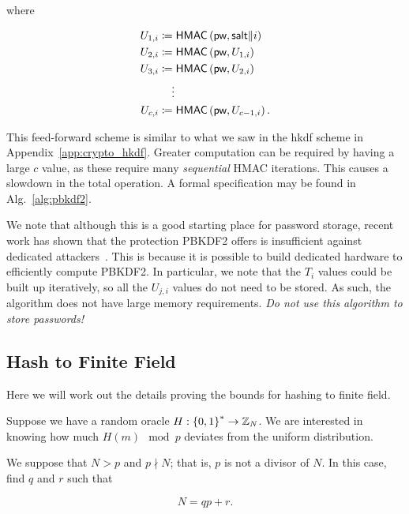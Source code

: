 \noindent
where

\begin{align}
    U_{1,i} &\coloneqq{} \textsf{HMAC}\left( \textsf{pw}, \textsf{salt} \| i \right)
        \nonumber\\
    U_{2,i} &\coloneqq{} \textsf{HMAC}\left( \textsf{pw}, U_{1,i} \right)
        \nonumber\\
    U_{3,i} &\coloneqq{} \textsf{HMAC}\left( \textsf{pw}, U_{2,i} \right)
        \nonumber\\
        &\quad \vdots \nonumber\\
    U_{c,i} &\coloneqq{} \textsf{HMAC}\left( \textsf{pw}, U_{c-1,i} \right).
\end{align}

\noindent
This feed-forward scheme is similar to what we saw in the \gls{hkdf}
scheme in Appendix~\ref{app:crypto_hkdf}.
Greater computation can be required by having a large $c$ value,
as these require many \emph{sequential} \textsf{HMAC} iterations.
This causes a slowdown in the total operation.
A formal specification may be found in Alg.~\ref{alg:pbkdf2}.

We note that although this is a good starting place for password storage,
recent work has shown that the protection PBKDF2 offers
is insufficient against dedicated attackers~\cite{blocki2018economics}.
This is because it is possible to build dedicated hardware
to efficiently compute PBKDF2.
In particular, we note that the $T_{i}$ values could be built up
iteratively, so all the $U_{j,i}$ values do not need to be stored.
As such, the algorithm does not have large memory requirements.
\emph{Do not use this algorithm to store passwords!}


\subsection{Hash to Finite Field}
\label{app:crypto_hash-to-finite-field}

Here we will work out the details proving the bounds for hashing
to \gls{finite field}.

Suppose we have a \gls{random oracle} $H:\left\{ 0,1 \right\}^{*}\to\mathbb{Z}_{N}$.
We are interested in knowing how much $H(m) \mod p$
deviates from the uniform distribution.

We suppose that $N>p$ and $p\nmid N$;
that is, $p$ is not a divisor of $N$.
In this case, find $q$ and $r$ such that

\begin{equation}
    N = qp + r.
\end{equation}

